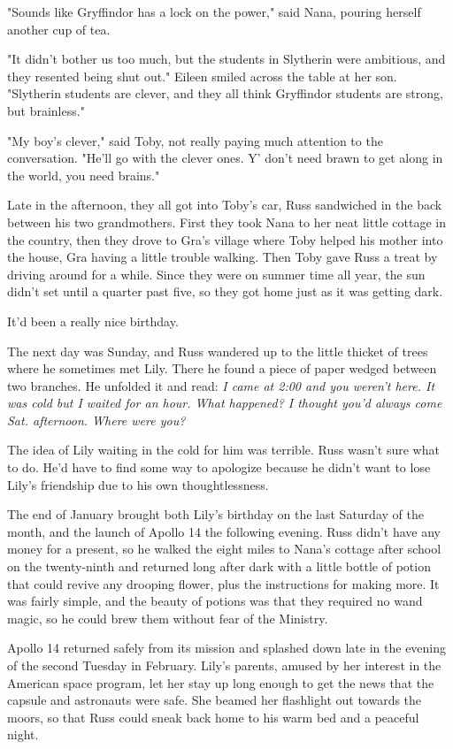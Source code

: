 \documentclass[a4paper,11pt]{article}
\begin{document}
"Sounds like Gryffindor has a lock on the power," said Nana, pouring herself another cup of tea.

"It didn't bother us too much, but the students in Slytherin were ambitious, and they resented being shut out." Eileen smiled across the table at her son. "Slytherin students are clever, and they all think Gryffindor students are strong, but brainless."

"My boy's clever," said Toby, not really paying much attention to the conversation. "He'll go with the clever ones. Y' don't need brawn to get along in the world, you need brains."

Late in the afternoon, they all got into Toby's car, Russ sandwiched in the back between his two grandmothers. First they took Nana to her neat little cottage in the country, then they drove to Gra's village where Toby helped his mother into the house, Gra having a little trouble walking. Then Toby gave Russ a treat by driving around for a while. Since they were on summer time all year, the sun didn't set until a quarter past five, so they got home just as it was getting dark.

It'd been a really nice birthday.

The next day was Sunday, and Russ wandered up to the little thicket of trees where he sometimes met Lily. There he found a piece of paper wedged between two branches. He unfolded it and read: \emph{I came at 2:00 and you weren't here. It was cold but I waited for an hour. What happened? I thought you'd always come Sat. afternoon. Where were you?}

The idea of Lily waiting in the cold for him was terrible. Russ wasn't sure what to do. He'd have to find some way to apologize because he didn't want to lose Lily's friendship due to his own thoughtlessness.

The end of January brought both Lily's birthday on the last Saturday of the month, and the launch of Apollo 14 the following evening. Russ didn't have any money for a present, so he walked the eight miles to Nana's cottage after school on the twenty-ninth and returned long after dark with a little bottle of potion that could revive any drooping flower, plus the instructions for making more. It was fairly simple, and the beauty of potions was that they required no wand magic, so he could brew them without fear of the Ministry.

Apollo 14 returned safely from its mission and splashed down late in the evening of the second Tuesday in February. Lily's parents, amused by her interest in the American space program, let her stay up long enough to get the news that the capsule and astronauts were safe. She beamed her flashlight out towards the moors, so that Russ could sneak back home to his warm bed and a peaceful night.
\end{document}
